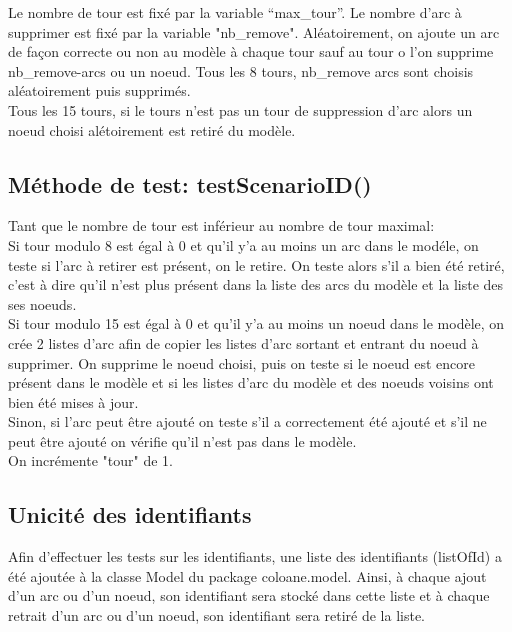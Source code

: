 \documentclass{article}
\begin{document}
Le nombre de tour est fix\'e par la variable ``max\_tour''.
Le nombre d'arc \`a supprimer est fix\'e par la variable "nb\_remove".
Al\'eatoirement, on ajoute un arc de fa\c{c}on correcte ou non au mod\`ele \`a 
chaque tour sauf au tour o l'on supprime nb\_remove-arcs ou un noeud.
Tous les 8 tours, nb\_remove arcs sont choisis al\'eatoirement puis supprim\'es.
\\

Tous les 15 tours, si le tours n'est pas un tour de suppression d'arc alors 
un noeud choisi al\'etoirement est retir\'e du mod\`ele.

\subsection{M\'ethode de test: testScenarioID()}

Tant que le nombre de tour est inf\'erieur au nombre de tour maximal:
\\

Si tour modulo 8 est \'egal \`a 0 et qu'il y'a au moins un arc dans le 
mod\'ele, on teste si l'arc \`a retirer est pr\'esent, on le retire.
On teste alors s'il a bien \'et\'e retir\'e, c'est \`a dire qu'il n'est 
plus pr\'esent dans la liste des arcs du mod\`ele et la liste des ses noeuds.
\\

Si tour modulo 15 est \'egal \`a 0 et qu'il y'a au moins un noeud dans le 
mod\`ele, on cr\'ee 2 listes d'arc afin de copier les listes d'arc sortant et 
entrant du noeud \`a supprimer.
On supprime le noeud choisi, puis on teste si le noeud est encore pr\'esent 
dans le mod\`ele et si les listes d'arc du mod\`ele et des noeuds voisins ont 
bien \'et\'e mises \`a jour.
\\

Sinon, si l'arc peut \^etre ajout\'e on teste s'il a correctement \'et\'e ajout\'e et 
s'il ne peut \^etre ajout\'e on v\'erifie qu'il n'est pas dans le mod\`ele.
\\

On incr\'emente "tour" de 1.

\subsection{Unicit\'e des identifiants}

Afin d'effectuer les tests sur les identifiants, une liste des identifiants 
(listOfId) a \'et\'e ajout\'ee \`a la classe Model du package coloane.model.
Ainsi, \`a chaque ajout d'un arc ou d'un noeud, son identifiant sera stock\'e 
dans cette liste et \`a chaque retrait d'un arc ou d'un noeud, son identifiant 
sera retir\'e de la liste.
\\
\end{document}
